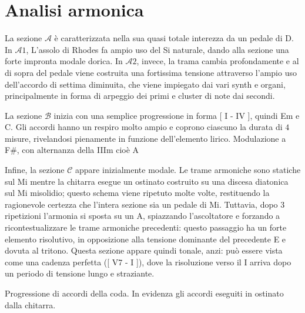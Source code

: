 \documentclass[class=book, crop=false, oneside, 12pt]{standalone}
\begin{document}
    \section{Analisi armonica}
    \label{sec:03-harmony}

    La sezione \(\mathcal{A}\) è caratterizzata nella sua quasi totale interezza da un pedale di D. In \(\mathcal{A}1\), L'assolo di Rhodes fa ampio uso del Si naturale, dando alla sezione una forte impronta modale dorica. 
    In \(\mathcal{A}2\), invece, la trama cambia profondamente e al di sopra del pedale viene costruita una fortissima tensione attraverso l'ampio uso dell'accordo di settima diminuita, che viene impiegato dai vari synth e organi, principalmente in forma di arpeggio dei primi e cluster di note dai secondi. 

    La sezione \(\mathcal{B}\) inizia con una semplice progressione in forma [ I - IV ], quindi Em e C. Gli accordi hanno un respiro molto ampio e coprono ciascuno la durata di \(4\) misure, rivelandosi pienamente in funzione dell'elemento lirico. 
    Modulazione a F\#, con alternanza della IIIm cioè A

    Infine, la sezione \(\mathcal{C}\) appare inizialmente modale. Le trame armoniche sono statiche sul Mi mentre la chitarra esegue un ostinato costruito su una discesa diatonica sul Mi misolidio; questo schema viene ripetuto molte volte, restituendo la ragionevole certezza che l'intera sezione sia un pedale di Mi. Tuttavia, dopo 3 ripetizioni l'armonia si sposta su un A, spiazzando l'ascoltatore e forzando a ricontestualizzare le trame armoniche precedenti: questo passaggio ha un forte elemento risolutivo, in opposizione alla tensione dominante del precedente E e dovuta al tritono. Questa sezione appare quindi tonale, anzi: può essere vista come una cadenza perfetta ([ V7 - I ]), dove la risoluzione verso il I arriva dopo un periodo di tensione lungo e straziante.

    
    \begin{sheet}[htbp]
        \centering
        \caption{Progressione di accordi della coda. In evidenza gli accordi eseguiti in ostinato dalla chitarra.}
        \label{sheet:sheep-guitar_out_chords}
    \end{sheet}
    
\end{document}
